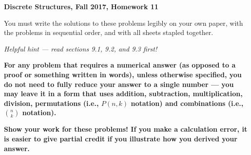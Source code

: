 \documentclass[11pt, letterpaper]{report}
\begin{document}
{\textbf{Discrete Structures, Fall 2017, Homework 11}}

\vspace*{.1in}

You must write the solutions to these problems legibly on your own paper, with
the problems in sequential order, and with all sheets stapled together.

\medskip

\emph{Helpful hint --- read sections 9.1, 9.2, and 9.3 first!}

\medskip

\textbf{For any problem that requires a numerical answer (as opposed to a proof or something written in words), unless otherwise specified, you do not need to fully reduce your
answer to a single number --- you may leave it in a form that uses addition, subtraction, multiplication, division, permutations (i.e., $P(n,k)$ notation)
and combinations (i.e., $\binom{n}{k}$ notation).}

\medskip

\textbf{Show your work for these problems! If you make a calculation error, it is easier to give partial credit if you illustrate how you derived your answer.}
\end{document}
